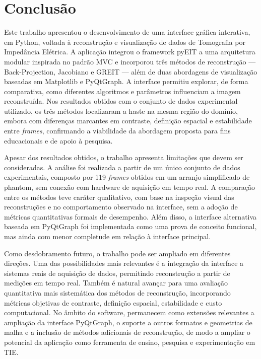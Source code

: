 
\chapter{Conclusão}

Este trabalho apresentou o desenvolvimento de uma interface gráfica interativa, em Python, voltada à reconstrução e visualização de dados de Tomografia por Impedância Elétrica. A aplicação integrou o framework pyEIT a uma arquitetura modular inspirada no padrão MVC e incorporou três métodos de reconstrução --- Back-Projection, Jacobiano e GREIT --- além de duas abordagens de visualização baseadas em Matplotlib e PyQtGraph. A interface permitiu explorar, de forma comparativa, como diferentes algoritmos e parâmetros influenciam a imagem reconstruída. Nos resultados obtidos com o conjunto de dados experimental utilizado, os três métodos localizaram a haste na mesma região do domínio, embora com diferenças marcantes em contraste, definição espacial e estabilidade entre \textit{frames}, confirmando a viabilidade da abordagem proposta para fins educacionais e de apoio à pesquisa.

Apesar dos resultados obtidos, o trabalho apresenta limitações que devem ser consideradas. A análise foi realizada a partir de um único conjunto de dados experimentais, composto por 119 \textit{frames} obtidos em um arranjo simplificado de phantom, sem conexão com hardware de aquisição em tempo real. A comparação entre os métodos teve caráter qualitativo, com base na inspeção visual das reconstruções e no comportamento observado na interface, sem a adoção de métricas quantitativas formais de desempenho. Além disso, a interface alternativa baseada em PyQtGraph foi implementada como uma prova de conceito funcional, mas ainda com menor completude em relação à interface principal.

Como desdobramento futuro, o trabalho pode ser ampliado em diferentes direções. Uma das possibilidades mais relevantes é a integração da interface a sistemas reais de aquisição de dados, permitindo reconstrução a partir de medições em tempo real. Também é natural avançar para uma avaliação quantitativa mais sistemática dos métodos de reconstrução, incorporando métricas objetivas de contraste, definição espacial, estabilidade e custo computacional. No âmbito do software, permanecem como extensões relevantes a ampliação da interface PyQtGraph, o suporte a outros formatos e geometrias de malha e a inclusão de métodos adicionais de reconstrução, de modo a ampliar o potencial da aplicação como ferramenta de ensino, pesquisa e experimentação em TIE.